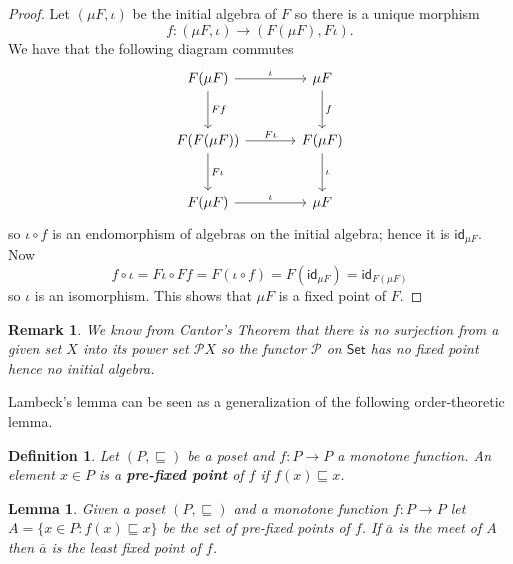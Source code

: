 \documentclass[letterpaper, 11pt, oneside]{memoir}
\theoremstyle{myteo}
\newtheorem{lemma}[theorem]{Lemma}
\newtheorem{definition}[theorem]{Definition}
\newtheorem{remark}[theorem]{Remark}
\numberwithin{equation}{section}
\newcommand{\id}{\textsf{id}}
\newcommand{\Set}{\textsf{Set}}
\begin{document}
\begin{proof}
  Let \((\mu F, \iota)\) be the initial algebra of \(F\) so there is a unique morphism
  \begin{equation*}
    f \colon (\mu F, \iota) \to (F(\mu F), F\iota).
  \end{equation*}
  We have that the following diagram commutes
  \begin{equation*}
    \begin{tikzcd}[sep = large]
      F(\mu F) \ar[r, "\iota"] \ar[d, "Ff"] & \mu F \ar[d, "f"]\\
      F(F(\mu F)) \ar[r, "F\iota"] \ar[d, "F\iota"]& F(\mu F) \ar[d, "\iota"]\\
      F(\mu F) \ar[r, "\iota"] & \mu F
    \end{tikzcd}
  \end{equation*}
  so \(\iota \circ f\) is an endomorphism of algebras on the initial algebra; hence it is \(\id_{\mu F}\).
  Now
  \begin{equation*}
    f \circ \iota = F\iota \circ Ff = F(\iota \circ f) = F(\id_{\mu F}) = \id_{F(\mu F)}
  \end{equation*}
  so \(\iota\) is an isomorphism.
  This shows that \(\mu F\) is a fixed point of \(F\).
\end{proof}

\begin{remark}
  We know from Cantor's Theorem that there is no surjection from a given set \(X\) into its power set \(\mathcal{P}X\) so the functor \(\mathcal{P}\) on \(\Set\) has no fixed point hence no initial algebra.
\end{remark}

Lambeck's lemma can be seen as a generalization of the following order-theoretic lemma.

\begin{definition}
  Let \((P, \sqsubseteq)\) be a poset and \(f \colon P \to P\) a monotone function.
  An element \(x \in P\) is a \textbf{pre-fixed point} of \(f\) if \(f(x) \sqsubseteq x\).
\end{definition}

\begin{lemma}
  \label{lemma:order_theory}
  Given a poset \((P, \sqsubseteq)\) and a monotone function \(f \colon P \to P\) let \(A = \{x \in P \colon f(x) \sqsubseteq x\}\) be the set of pre-fixed points of \(f\).
  If \(\overline{a}\) is the meet of \(A\) then \(\overline{a}\) is the least fixed point of \(f\).
\end{lemma}
\end{document}
